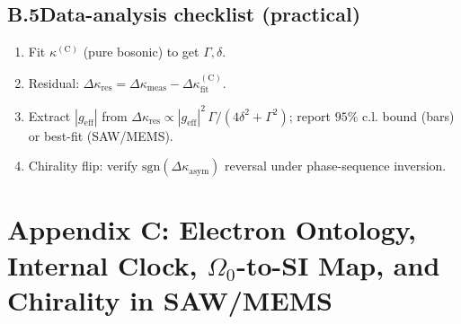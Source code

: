 \documentclass[aps,prb,preprint,amsmath,amssymb]{revtex4-2} %
\begin{document}
    \subsection*{B.5\quad Data-analysis checklist (practical)}
        \begin{enumerate}\itemsep2pt
        \item Fit \(\kappa^{(\mathrm C)}\) (pure bosonic) to get \(\Gamma,\delta\).
        \item Residual: \(\Delta\kappa_\textrm{res}=\Delta\kappa_\textrm{meas}-\Delta\kappa^{(\mathrm C)}_\textrm{fit}\).
        \item Extract \(|g_\textrm{eff}|\) from \(\Delta\kappa_\textrm{res}\propto |g_\textrm{eff}|^2\,\Gamma/(4\delta^2+\Gamma^2)\); report \(95\%\) c.l. bound (bars) or best-fit (SAW/MEMS).
        \item Chirality flip: verify \(\mathrm{sgn}(\Delta\kappa_\textrm{asym})\) reversal under phase-sequence inversion.
        \end{enumerate}

\section*{Appendix C: Electron Ontology, Internal Clock, \texorpdfstring{$\Omega_{0}$}{Omega0}-to-SI Map, and Chirality in SAW/MEMS}
\end{document}
